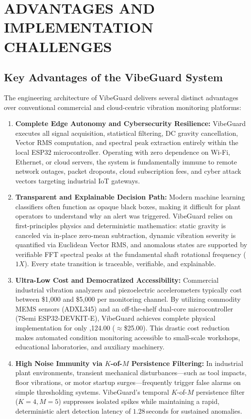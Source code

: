 \chapter{ADVANTAGES AND IMPLEMENTATION CHALLENGES}
\label{ch:advantages_challenges}

\section{Key Advantages of the VibeGuard System}
The engineering architecture of VibeGuard delivers several distinct advantages over conventional commercial and cloud-centric vibration monitoring platforms:

\begin{enumerate}
    \item \textbf{Complete Edge Autonomy and Cybersecurity Resilience:} VibeGuard executes all signal acquisition, statistical filtering, DC gravity cancellation, Vector RMS computation, and spectral peak extraction entirely within the local ESP32 microcontroller. Operating with zero dependence on Wi-Fi, Ethernet, or cloud servers, the system is fundamentally immune to remote network outages, packet dropouts, cloud subscription fees, and cyber attack vectors targeting industrial IoT gateways.
    \item \textbf{Transparent and Explainable Decision Path:} Modern machine learning classifiers often function as opaque black boxes, making it difficult for plant operators to understand why an alert was triggered. VibeGuard relies on first-principles physics and deterministic mathematics: static gravity is canceled via in-place zero-mean subtraction, dynamic vibration severity is quantified via Euclidean Vector RMS, and anomalous states are supported by verifiable FFT spectral peaks at the fundamental shaft rotational frequency ($1X$). Every state transition is traceable, verifiable, and explainable.
    \item \textbf{Ultra-Low Cost and Democratized Accessibility:} Commercial industrial vibration analyzers and piezoelectric accelerometers typically cost between \$1,000 and \$5,000 per monitoring channel. By utilizing commodity MEMS sensors (ADXL345) and an off-the-shelf dual-core microcontroller (7Semi ESP32-DEVKIT-E), VibeGuard achieves complete physical implementation for only ,124.00 ($\approx$\$25.00). This drastic cost reduction makes automated condition monitoring accessible to small-scale workshops, educational laboratories, and auxiliary machinery.
    \item \textbf{High Noise Immunity via $K$-of-$M$ Persistence Filtering:} In industrial plant environments, transient mechanical disturbances---such as tool impacts, floor vibrations, or motor startup surges---frequently trigger false alarms on simple thresholding systems. VibeGuard's temporal $K$-of-$M$ persistence filter ($K=4, M=5$) suppresses isolated spikes while maintaining a rapid, deterministic alert detection latency of $1.28$\,seconds for sustained anomalies.

\end{enumerate}
